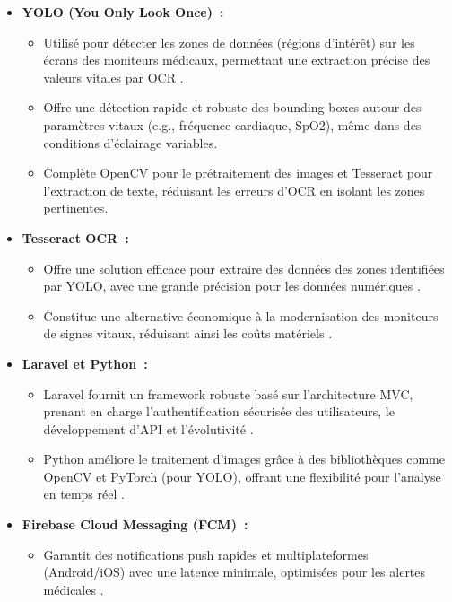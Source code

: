 \begin{itemize}
    \item \textbf{YOLO (You Only Look Once)~:}
    \begin{itemize}
        \item Utilisé pour détecter les zones de données (régions d’intérêt) sur les écrans des moniteurs médicaux, permettant une extraction précise des valeurs vitales par OCR \cite{yolo2023}. %
        \item Offre une détection rapide et robuste des bounding boxes autour des paramètres vitaux (e.g., fréquence cardiaque, SpO2), même dans des conditions d'éclairage variables.
        \item Complète OpenCV pour le prétraitement des images et Tesseract pour l'extraction de texte, réduisant les erreurs d'OCR en isolant les zones pertinentes.
    \end{itemize}
    \item \textbf{Tesseract OCR~:}
    \begin{itemize}
        \item Offre une solution efficace pour extraire des données des zones identifiées par YOLO, avec une grande précision pour les données numériques \cite{tesseract2023}. %
        \item Constitue une alternative économique à la modernisation des moniteurs de signes vitaux, réduisant ainsi les coûts matériels \cite{smith2022}.
    \end{itemize}
    \item \textbf{Laravel et Python~:}
    \begin{itemize}
        \item Laravel fournit un framework robuste basé sur l'architecture MVC, prenant en charge l'authentification sécurisée des utilisateurs, le développement d'API et l'évolutivité \cite{laravel2023}.
        \item Python améliore le traitement d'images grâce à des bibliothèques comme OpenCV et PyTorch (pour YOLO), offrant une flexibilité pour l'analyse en temps réel \cite{opencv2023}. %
    \end{itemize}
    \item \textbf{Firebase Cloud Messaging (FCM)~:}
    \begin{itemize}
        \item Garantit des notifications push rapides et multiplateformes (Android/iOS) avec une latence minimale, optimisées pour les alertes médicales \cite{fcm2023}.
    \end{itemize}
\end{itemize}


